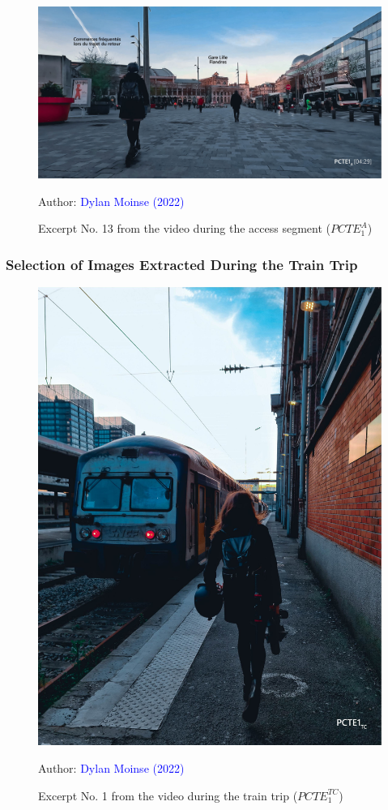     \begin{figure}[h!]\vspace*{4pt}
        \caption*{Excerpt No. 13 from the video during the access segment (\(PCTE^{A}_{1}\))}
        \centerline{\includegraphics[width=0.75\columnwidth]{src/Figures/Annexes/Extrait_Video_PCTE1_Access_13.jpg}}
        \vspace{5pt}
        \begin{flushright}\scriptsize{
        Author: \textcolor{blue}{Dylan Moinse (2022)}
        }\end{flushright}
    \end{figure}


\subsubsection{Selection of Images Extracted During the Train Trip}

    \begin{figure}[h!]\vspace*{4pt}
        \caption*{Excerpt No. 1 from the video during the train trip (\(PCTE^{TC}_{1}\))}
        \centerline{\includegraphics[width=0.5\columnwidth]{src/Figures/Annexes/Extrait_Video_PCTE1_TC_1.jpg}}
        \vspace{5pt}
        \begin{flushright}\scriptsize{
        Author: \textcolor{blue}{Dylan Moinse (2022)}
        }\end{flushright}
    \end{figure}

